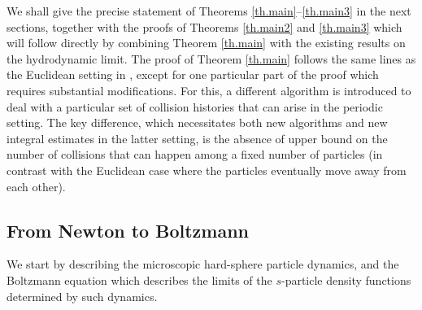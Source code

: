 \documentclass[10pt, reqno]{amsart}
\theoremstyle{definition}
\theoremstyle{remark}
\numberwithin{equation}{section}
\begin{document}
We shall give the precise statement of Theorems \ref{th.main}--\ref{th.main3} in the next sections, together with the proofs of Theorems \ref{th.main2} and \ref{th.main3} which will follow directly by combining Theorem \ref{th.main} with the existing results on the hydrodynamic limit. The proof of Theorem \ref{th.main} follows the same lines as the Euclidean setting in \cite{DHM24}, except for one particular part of the proof which requires substantial modifications. For this, a different algorithm is introduced to deal with a particular set of collision histories that can arise in the periodic setting. The key difference, which necessitates both new algorithms and new integral estimates in the latter setting, is the absence of upper bound on the number of collisions that can happen among a fixed number of particles (in contrast with the Euclidean case where the particles eventually move away from each other). 

\subsection{From Newton to Boltzmann}\label{sec.setup} We start by describing the microscopic hard-sphere particle dynamics, and the Boltzmann equation which describes the limits of the $s$-particle density functions determined by such dynamics.
\end{document}
